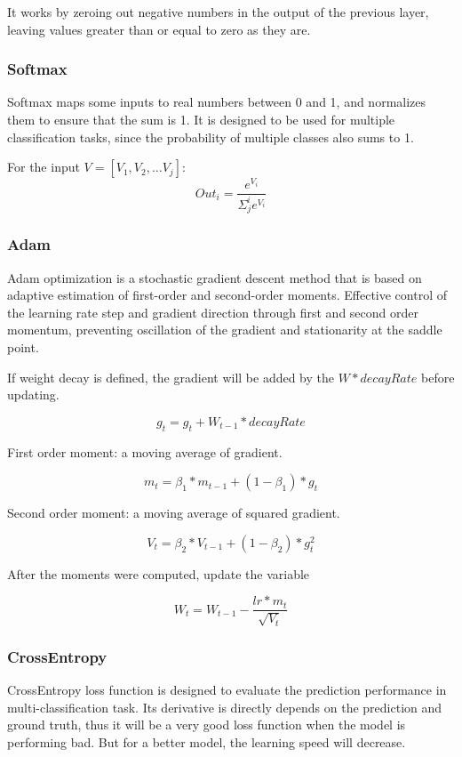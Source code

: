 \documentclass{article}[12pt]
\begin{document}
    It works by zeroing out negative numbers in the output of the previous layer,
    leaving values greater than or equal to zero as they are.

\subsubsection{Softmax}
    Softmax maps some inputs to real numbers between 0 and 1, and normalizes them to ensure that the sum is 1.
    It is designed to be used for multiple classification tasks, since the probability of multiple classes also sums to 1.

    For the input $V = [V_1, V_2, \dots V_j]$:
\[ Out_i = \frac{e^{V_i}}{\Sigma^i_j e^{V_i}}\]

\subsubsection{Adam}
    Adam optimization is a stochastic gradient descent method that is based on adaptive estimation of first-order and
    second-order moments.
    Effective control of the learning rate step and gradient direction through first and second order momentum,
    preventing oscillation of the gradient and stationarity at the saddle point.

    If weight decay is defined, the gradient will be added by the $W * decayRate$ before updating.

\[g_t = g_t + W_{t-1} * decayRate\]

    First order moment: a moving average of gradient.

\[m_t = \beta_1 * m_{t-1} + (1 - \beta_1) * g_t\]

    Second order moment: a moving average of squared gradient.

\[V_t = \beta_2 * V_{t-1} + (1 - \beta_2) * g_t^2\]

    After the moments were computed, update the variable

\[W_t = W_{t-1} - \frac{lr * m_t}{\sqrt{V_t}}\]

\subsubsection{CrossEntropy}
    CrossEntropy loss function is designed to evaluate the prediction performance in multi-classification task.
    Its derivative is directly depends on the prediction and ground truth, thus it will be a very good loss function
    when the model is performing bad.
    But for a better model, the learning speed will decrease.
\end{document}
